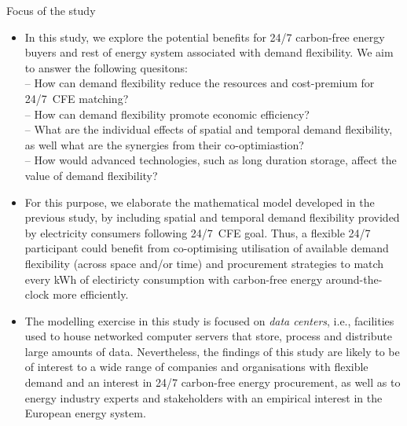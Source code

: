 \begin{frame}{Focus of the study}


  {\footnotesize
  \begin{itemize}
    \item In this study, we explore the potential benefits for 24/7 carbon-free energy buyers and rest of energy system associated with demand flexibility. We aim to answer the following quesitons: \\

    \vspace{0.1cm}
    -- How can demand flexibility reduce the \alert{resources} and \alert{cost-premium} for 24/7~CFE matching?\\ 
    -- How can demand flexibility promote \alert{economic efficiency}?\\
    -- What are the \alert{individual effects} of spatial and temporal demand flexibility, as well what are the synergies from their co-optimiastion? \\
    -- How would advanced technologies, such as long duration storage, affect \alert{the value of demand flexibility}?

    \item For this purpose, we elaborate the mathematical model developed in the previous study, by including spatial and temporal demand flexibility provided by electricity consumers following 24/7~CFE goal. Thus, a flexible 24/7 participant could benefit from \alert{co-optimising} utilisation of available demand flexibility (across space and/or time) and procurement strategies to match every kWh of electiricty consumption with carbon-free energy around-the-clock \alert{more efficiently}.
    
    \item The modelling exercise in this study is focused on \textit{data centers}, i.e., facilities used to house networked computer servers that store, process and distribute large amounts of data. Nevertheless, the findings of this study are likely to be of interest to a wide range of companies and organisations with flexible demand and an interest in 24/7 carbon-free energy procurement, as well as to energy industry experts and stakeholders with an empirical interest in the European energy system.

  \end{itemize}

  }

\end{frame}



